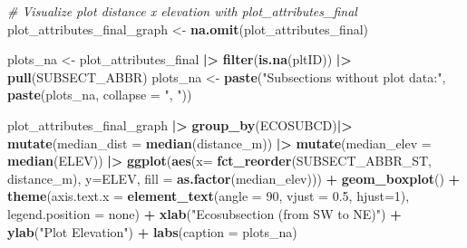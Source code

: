 \documentclass[
]{book}
\newenvironment{Shaded}{\begin{snugshade}}{\end{snugshade}}
\newcommand{\AttributeTok}[1]{\textcolor[rgb]{0.13,0.29,0.53}{#1}}
\newcommand{\CommentTok}[1]{\textcolor[rgb]{0.56,0.35,0.01}{\textit{#1}}}
\newcommand{\DecValTok}[1]{\textcolor[rgb]{0.00,0.00,0.81}{#1}}
\newcommand{\FloatTok}[1]{\textcolor[rgb]{0.00,0.00,0.81}{#1}}
\newcommand{\FunctionTok}[1]{\textcolor[rgb]{0.13,0.29,0.53}{\textbf{#1}}}
\newcommand{\NormalTok}[1]{#1}
\newcommand{\OtherTok}[1]{\textcolor[rgb]{0.56,0.35,0.01}{#1}}
\newcommand{\SpecialCharTok}[1]{\textcolor[rgb]{0.81,0.36,0.00}{\textbf{#1}}}
\newcommand{\StringTok}[1]{\textcolor[rgb]{0.31,0.60,0.02}{#1}}
\begin{document}
\begin{Shaded}
\begin{Highlighting}[]
\CommentTok{\# Visualize plot distance x elevation with plot\_attributes\_final}
\NormalTok{plot\_attributes\_final\_graph }\OtherTok{\textless{}{-}} \FunctionTok{na.omit}\NormalTok{(plot\_attributes\_final)}

\NormalTok{plots\_na }\OtherTok{\textless{}{-}}\NormalTok{ plot\_attributes\_final }\SpecialCharTok{|\textgreater{}}
  \FunctionTok{filter}\NormalTok{(}\FunctionTok{is.na}\NormalTok{(pltID)) }\SpecialCharTok{|\textgreater{}}
  \FunctionTok{pull}\NormalTok{(SUBSECT\_ABBR)}
\NormalTok{plots\_na }\OtherTok{\textless{}{-}} \FunctionTok{paste}\NormalTok{(}\StringTok{"Subsections without plot data:"}\NormalTok{, }\FunctionTok{paste}\NormalTok{(plots\_na, }\AttributeTok{collapse =} \StringTok{", "}\NormalTok{))}

\NormalTok{plot\_attributes\_final\_graph }\SpecialCharTok{|\textgreater{}}
  \FunctionTok{group\_by}\NormalTok{(ECOSUBCD)}\SpecialCharTok{|\textgreater{}}
  \FunctionTok{mutate}\NormalTok{(}\AttributeTok{median\_dist =} \FunctionTok{median}\NormalTok{(distance\_m)) }\SpecialCharTok{|\textgreater{}}
  \FunctionTok{mutate}\NormalTok{(}\AttributeTok{median\_elev =} \FunctionTok{median}\NormalTok{(ELEV)) }\SpecialCharTok{|\textgreater{}}
  \FunctionTok{ggplot}\NormalTok{(}\FunctionTok{aes}\NormalTok{(}\AttributeTok{x=} \FunctionTok{fct\_reorder}\NormalTok{(SUBSECT\_ABBR\_ST, distance\_m), }
             \AttributeTok{y=}\NormalTok{ELEV, }
             \AttributeTok{fill =} \FunctionTok{as.factor}\NormalTok{(median\_elev))) }\SpecialCharTok{+}
  \FunctionTok{geom\_boxplot}\NormalTok{() }\SpecialCharTok{+}
  \FunctionTok{theme}\NormalTok{(}\AttributeTok{axis.text.x =} \FunctionTok{element\_text}\NormalTok{(}\AttributeTok{angle =} \DecValTok{90}\NormalTok{, }\AttributeTok{vjust =} \FloatTok{0.5}\NormalTok{, }\AttributeTok{hjust=}\DecValTok{1}\NormalTok{),}
        \AttributeTok{legend.position =} \StringTok{\textquotesingle{}none\textquotesingle{}}\NormalTok{) }\SpecialCharTok{+}
  \FunctionTok{xlab}\NormalTok{(}\StringTok{"Ecosubsection (from SW to NE)"}\NormalTok{) }\SpecialCharTok{+} \FunctionTok{ylab}\NormalTok{(}\StringTok{"Plot Elevation"}\NormalTok{) }\SpecialCharTok{+}
  \FunctionTok{labs}\NormalTok{(}\AttributeTok{caption =}\NormalTok{ plots\_na)}
\end{Highlighting}
\end{Shaded}
\end{document}
